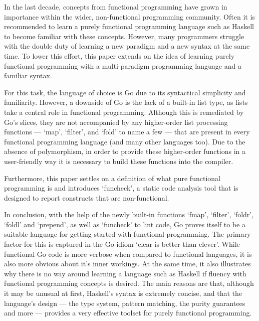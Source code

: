 

In the last decade, concepts from functional programming have grown in
importance within the wider, non-functional programming community.
Often it is recommended to learn a purely functional programming language
such as Haskell to become familiar with these concepts.
However, many programmers struggle with the double duty
of learning a new paradigm and a new syntax at the same time. To lower this
effort, this paper extends on the idea of learning purely functional programming
with a multi-paradigm programming language and a familiar syntax.

For this task, the language of choice is Go due to its syntactical
simplicity and familiarity.
However, a downside of Go is the lack of a built-in list type, as lists take a
central role in functional programming. Although this is remediated by Go's slices,
they are not accompanied by any higher-order list processing functions --- `map', `filter', and `fold' to name a
few --- that are present in every functional programming language (and many
other languages too).
Due to the absence of polymorphism, in order to provide these higher-order functions in
a user-friendly way it is necessary to build these functions into the compiler.

Furthermore, this paper settles on a definition of what pure functional programming is and
introduces `funcheck', a static code analysis tool that is designed to
report constructs that are non-functional.

In conclusion, with the help of the newly built-in functions `fmap', `filter', `foldr', `foldl' and
`prepend', as well as `funcheck' to lint code, Go proves itself to be a
suitable language for getting started with functional programming.
The primary factor for this is captured in the Go idiom `clear is better than clever'.
While functional Go code is more verbose when compared to functional languages, it
is also more obvious about it's inner workings.
At the same time, it also illustrates why there is no way around learning a
language such as Haskell if fluency with functional programming concepts
is desired. The main reasons are that, although it may be unusual at first, Haskell's
syntax is extremely concise, and that the language's design --- the type system,
pattern matching, the purity guarantees and more --- provides a very effective toolset
for purely functional programming.
